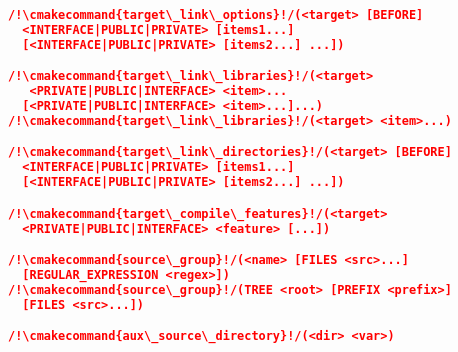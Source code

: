 \documentclass{article}
\newcommand{\cmakecommand}[1]{{\href{https://cmake.org/cmake/help/v3.13/command/#1.html}{#1}}}
\begin{document}
\begin{minipage}[t]{0.18\linewidth}
\begin{lstlisting}[language=CMake]
/!\cmakecommand{target\_link\_options}!/(<target> [BEFORE]
  <INTERFACE|PUBLIC|PRIVATE> [items1...]
  [<INTERFACE|PUBLIC|PRIVATE> [items2...] ...])

/!\cmakecommand{target\_link\_libraries}!/(<target>
   <PRIVATE|PUBLIC|INTERFACE> <item>...
  [<PRIVATE|PUBLIC|INTERFACE> <item>...]...)
/!\cmakecommand{target\_link\_libraries}!/(<target> <item>...)

/!\cmakecommand{target\_link\_directories}!/(<target> [BEFORE]
  <INTERFACE|PUBLIC|PRIVATE> [items1...]
  [<INTERFACE|PUBLIC|PRIVATE> [items2...] ...])

/!\cmakecommand{target\_compile\_features}!/(<target>
  <PRIVATE|PUBLIC|INTERFACE> <feature> [...])

/!\cmakecommand{source\_group}!/(<name> [FILES <src>...]
  [REGULAR_EXPRESSION <regex>])
/!\cmakecommand{source\_group}!/(TREE <root> [PREFIX <prefix>]
  [FILES <src>...])

/!\cmakecommand{aux\_source\_directory}!/(<dir> <var>)
\end{lstlisting}

\end{minipage}
\hfill\vline\hfill
\end{document}
